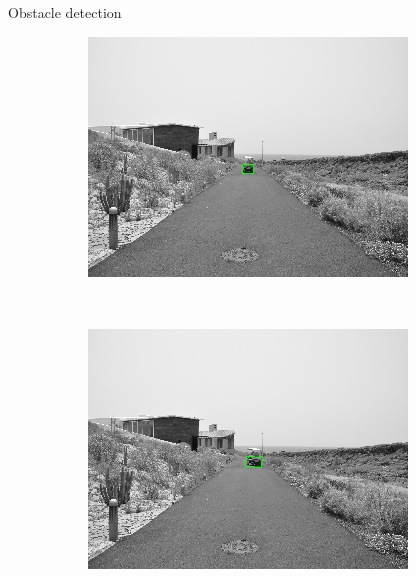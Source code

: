 \begin{frame}{Obstacle detection}
  \begin{figure}[h!]
      \centering
      \begin{subfigure}[b]{0.24\columnwidth}
	  \includegraphics[width=\textwidth]{sequence/seq1}\label{fig:seq1}
      \end{subfigure}%
      ~
      \begin{subfigure}[b]{0.24\columnwidth}
	  \includegraphics[width=\textwidth]{sequence/seq2}\label{fig:seq2}
      \end{subfigure}%
      ~
      \begin{subfigure}[b]{0.24\columnwidth}

\end{subfigure}
\end{figure}
\end{frame}
